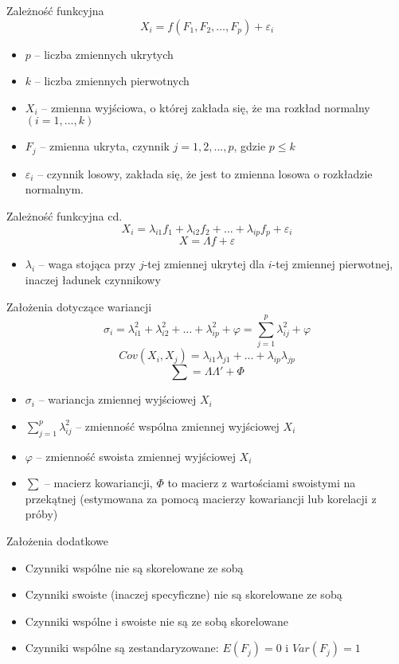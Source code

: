 \documentclass{beamer}
\begin{document}
\begin{frame}{Zależność funkcyjna}
  $$X_i = f( F_1, F_2, \dots, F_p) + \varepsilon_i $$
  \begin{itemize}
  \item $p$ -- liczba zmiennych ukrytych
  \item $k$ -- liczba zmiennych pierwotnych
  \item $X_i$ -- zmienna wyjściowa, o której zakłada się, że ma rozkład normalny $(i = 1,...,k)$
  \item $F_j$ -- zmienna ukryta, czynnik $j=1,2,...,p$, gdzie $p \leq k$
  \item $\varepsilon_i$ -- czynnik losowy, zakłada się, że jest to zmienna losowa o rozkładzie normalnym.
  \end{itemize}
\end{frame}

\begin{frame}{Zależność funkcyjna cd.}
  $$X_i = \lambda_{i1}f_1 + \lambda_{i2}f_2 + \dots + \lambda_{ip}f_{p} + \varepsilon_i $$
  $$X = \Lambda f + \varepsilon $$
  \begin{itemize}
    \item $\lambda_i$ -- waga stojąca przy $j$-tej zmiennej ukrytej dla $i$-tej zmiennej pierwotnej, inaczej ładunek czynnikowy
  \end{itemize}
\end{frame}

\begin{frame}{Założenia dotyczące wariancji}
  $$\sigma_i = \lambda^2_{i1} + \lambda^2_{i2} +\dots+ \lambda^2_{ip} + \varphi = \sum_{j=1}^p \lambda_{ij}^{2} + \varphi $$
  $$Cov(X_i, X_j) = \lambda_{i1}\lambda_{j1} +\dots + \lambda_{ip}\lambda_{jp}$$
  $$\sum = \Lambda\Lambda' + \Phi $$
  \begin{itemize}
  \item $\sigma_i$ -- wariancja zmiennej wyjściowej $X_i$
  \item $\sum_{j=1}^{p}\lambda^2_{ij}$ -- zmienność wspólna zmiennej wyjściowej $X_i$
  \item $\varphi$ -- zmienność swoista zmiennej wyjściowej $X_i$
  \item $\sum$ -- macierz kowariancji, $\Phi$ to macierz z wartościami swoistymi na przekątnej (estymowana za pomocą macierzy kowariancji lub korelacji z próby)
   \end{itemize}
\end{frame}

\begin{frame}{Założenia dodatkowe}
  \begin{itemize}
  \item Czynniki wspólne nie są skorelowane ze sobą
  \item Czynniki swoiste (inaczej specyficzne) nie są skorelowane ze sobą
  \item Czynniki wspólne i swoiste nie są ze sobą skorelowane
  \item Czynniki wspólne są zestandaryzowane: $E(F_j) = 0$ i $Var(F_{j}) = 1$
   \end{itemize}
\end{frame}
\end{document}
